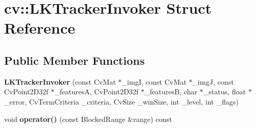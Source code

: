 \hypertarget{structcv_1_1_l_k_tracker_invoker}{\section{cv\-:\-:\-L\-K\-Tracker\-Invoker \-Struct \-Reference}
\label{structcv_1_1_l_k_tracker_invoker}
}
\subsection*{\-Public \-Member \-Functions}
\begin{DoxyCompactItemize}
\item 
\hypertarget{structcv_1_1_l_k_tracker_invoker_a6b752725de298b22f243b9c3647b3de3}{{\bfseries \-L\-K\-Tracker\-Invoker} (const \-Cv\-Mat $\ast$\-\_\-img\-I, const \-Cv\-Mat $\ast$\-\_\-img\-J, const \-Cv\-Point2\-D32f $\ast$\-\_\-features\-A, \-Cv\-Point2\-D32f $\ast$\-\_\-features\-B, char $\ast$\-\_\-status, float $\ast$\-\_\-error, \-Cv\-Term\-Criteria \-\_\-criteria, \-Cv\-Size \-\_\-win\-Size, int \-\_\-level, int \-\_\-flags)}\label{structcv_1_1_l_k_tracker_invoker_a6b752725de298b22f243b9c3647b3de3}

\item 
\hypertarget{structcv_1_1_l_k_tracker_invoker_af33bf8aa0447d6437b50c8a9d394ec8f}{void {\bfseries operator()} (const \-Blocked\-Range \&range) const }\label{structcv_1_1_l_k_tracker_invoker_af33bf8aa0447d6437b50c8a9d394ec8f}

\end{DoxyCompactItemize}
